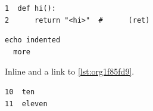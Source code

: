 \documentclass[11pt]{article}
\date{\today}
\title{}
\begin{document}
\tableofcontents

\begin{verbatim}
1  def hi():
2      return "<hi>"  #      (ret)
\end{verbatim}

\begin{verbatim}
echo indented
  more
\end{verbatim}

Inline and a link to \ref{lst:org1f85fd9}.

\begin{verbatim}
10  ten
11  eleven
\end{verbatim}
\end{document}
